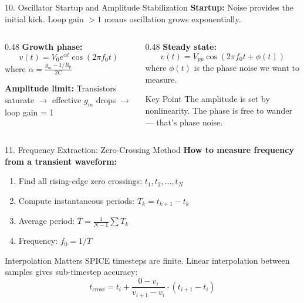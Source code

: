 \documentclass[aspectratio=169, 11pt]{beamer}
\begin{document}
\begin{frame}{10. Oscillator Startup and Amplitude Stabilization}
    \textbf{Startup:} Noise provides the initial kick. Loop gain $> 1$ means oscillation grows exponentially.

    \vspace{0.5em}
    \begin{columns}[T]
        \begin{column}{0.48\textwidth}
            \textbf{Growth phase:}
            \[ v(t) = V_0 e^{\alpha t} \cos(2\pi f_0 t) \]
            where $\alpha = \frac{g_m - 1/R_p}{2C}$

            \vspace{0.5em}
            \textbf{Amplitude limit:}
            Transistors saturate $\rightarrow$ effective $g_m$ drops $\rightarrow$ loop gain = 1
        \end{column}
        \begin{column}{0.48\textwidth}
            \textbf{Steady state:}
            \[ v(t) = V_{pp} \cos(2\pi f_0 t + \phi(t)) \]
            where $\phi(t)$ is the phase noise we want to measure.

            \vspace{0.5em}
            \begin{block}{Key Point}
                The amplitude is set by nonlinearity. The phase is free to wander — that's phase noise.
            \end{block}
        \end{column}
    \end{columns}
\end{frame}

\begin{frame}{11. Frequency Extraction: Zero-Crossing Method}
    \textbf{How to measure frequency from a transient waveform:}

    \vspace{0.5em}
    \begin{enumerate}
        \item Find all rising-edge zero crossings: $t_1, t_2, \ldots, t_N$
        \item Compute instantaneous periods: $T_k = t_{k+1} - t_k$
        \item Average period: $\bar{T} = \frac{1}{N-1}\sum T_k$
        \item Frequency: $f_0 = 1/\bar{T}$
    \end{enumerate}

    \vspace{0.5em}
    \begin{block}{Interpolation Matters}
        SPICE timesteps are finite. Linear interpolation between samples gives sub-timestep accuracy:
        \[ t_{\text{cross}} = t_i + \frac{0 - v_i}{v_{i+1} - v_i} \cdot (t_{i+1} - t_i) \]
    \end{block}
\end{frame}
\end{document}

